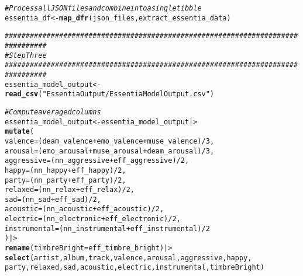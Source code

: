\documentclass{article}\usepackage[]{graphicx}\usepackage[]{xcolor}
\makeatletter
\newcommand{\hlnum}[1]{\textcolor[rgb]{0.686,0.059,0.569}{#1}}%
\newcommand{\hlsng}[1]{\textcolor[rgb]{0.192,0.494,0.8}{#1}}%
\newcommand{\hlcom}[1]{\textcolor[rgb]{0.678,0.584,0.686}{\textit{#1}}}%
\newcommand{\hlopt}[1]{\textcolor[rgb]{0,0,0}{#1}}%
\newcommand{\hldef}[1]{\textcolor[rgb]{0.345,0.345,0.345}{#1}}%
\newcommand{\hlkwb}[1]{\textcolor[rgb]{0.69,0.353,0.396}{#1}}%
\newcommand{\hlkwc}[1]{\textcolor[rgb]{0.333,0.667,0.333}{#1}}%
\newcommand{\hlkwd}[1]{\textcolor[rgb]{0.737,0.353,0.396}{\textbf{#1}}}%
\newenvironment{kframe}{%
 \def\at@end@of@kframe{}%
 \ifinner\ifhmode%
  \def\at@end@of@kframe{\end{minipage}}%
  \begin{minipage}{\columnwidth}%
 \fi\fi%
 \def\FrameCommand##1{\hskip\@totalleftmargin \hskip-\fboxsep
 \colorbox{shadecolor}{##1}\hskip-\fboxsep
     \hskip-\linewidth \hskip-\@totalleftmargin \hskip\columnwidth}%
 \MakeFramed {\advance\hsize-\width
   \@totalleftmargin\z@ \linewidth\hsize
   \@setminipage}}%
 {\par\unskip\endMakeFramed%
 \at@end@of@kframe}
\newenvironment{knitrout}{}{} %
\makeatother
\begin{document}
\begin{enumerate}
\begin{knitrout}
\begin{kframe}
\begin{alltt}
\hlcom{# Process all JSON files and combine into a single tibble}
\hldef{essentia_df} \hlkwb{<-} \hlkwd{map_dfr}\hldef{(json_files, extract_essentia_data)}

\hlcom{################################################################################}
\hlcom{# Step Three}
\hlcom{################################################################################}
\hldef{essentia_model_output} \hlkwb{<-} \hlkwd{read_csv}\hldef{(}\hlsng{"EssentiaOutput/EssentiaModelOutput.csv"}\hldef{)}

\hlcom{# Compute averaged columns }
\hldef{essentia_model_output} \hlkwb{<-} \hldef{essentia_model_output |>}
  \hlkwd{mutate}\hldef{(}
    \hlkwc{valence} \hldef{= (deam_valence} \hlopt{+} \hldef{emo_valence} \hlopt{+} \hldef{muse_valence)} \hlopt{/} \hlnum{3}\hldef{,}
    \hlkwc{arousal} \hldef{= (emo_arousal} \hlopt{+} \hldef{muse_arousal} \hlopt{+} \hldef{deam_arousal)} \hlopt{/} \hlnum{3}\hldef{,}
    \hlkwc{aggressive} \hldef{= (nn_aggressive} \hlopt{+} \hldef{eff_aggressive)} \hlopt{/} \hlnum{2}\hldef{,}
    \hlkwc{happy} \hldef{= (nn_happy} \hlopt{+} \hldef{eff_happy)} \hlopt{/} \hlnum{2}\hldef{,}
    \hlkwc{party} \hldef{= (nn_party} \hlopt{+} \hldef{eff_party)} \hlopt{/} \hlnum{2}\hldef{,}
    \hlkwc{relaxed} \hldef{= (nn_relax} \hlopt{+} \hldef{eff_relax)} \hlopt{/} \hlnum{2}\hldef{,}
    \hlkwc{sad} \hldef{= (nn_sad} \hlopt{+} \hldef{eff_sad)} \hlopt{/} \hlnum{2}\hldef{,}
    \hlkwc{acoustic} \hldef{= (nn_acoustic} \hlopt{+} \hldef{eff_acoustic)} \hlopt{/} \hlnum{2}\hldef{,}
    \hlkwc{electric} \hldef{= (nn_electronic} \hlopt{+} \hldef{eff_electronic)} \hlopt{/} \hlnum{2}\hldef{,}
    \hlkwc{instrumental} \hldef{= (nn_instrumental} \hlopt{+} \hldef{eff_instrumental)} \hlopt{/} \hlnum{2}
  \hldef{)|>}
  \hlkwd{rename}\hldef{(}\hlkwc{timbreBright} \hldef{= eff_timbre_bright) |>}
  \hlkwd{select}\hldef{(artist, album, track, valence, arousal, aggressive, happy,}
         \hldef{party, relaxed, sad, acoustic, electric, instrumental, timbreBright)}


\end{alltt}
\end{kframe}
\end{knitrout}
\end{enumerate}
\end{document}
